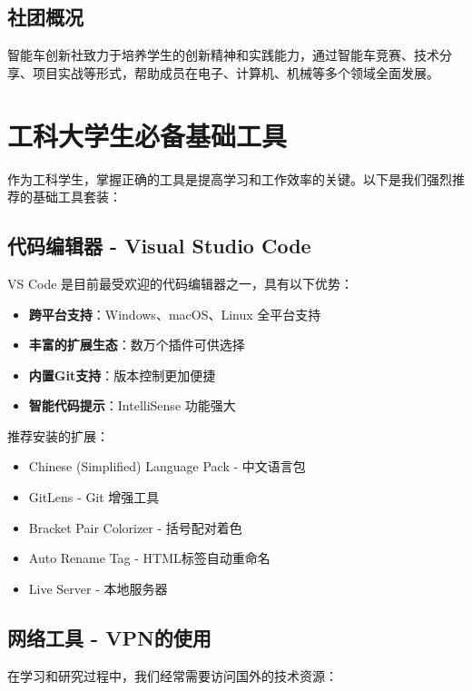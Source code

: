 \documentclass[a4paper,12pt]{article}
\begin{document}
\subsection{社团概况}

智能车创新社致力于培养学生的创新精神和实践能力，通过智能车竞赛、技术分享、项目实战等形式，帮助成员在电子、计算机、机械等多个领域全面发展。

\section{工科大学生必备基础工具}

作为工科学生，掌握正确的工具是提高学习和工作效率的关键。以下是我们强烈推荐的基础工具套装：

\subsection{代码编辑器 - Visual Studio Code}

VS Code 是目前最受欢迎的代码编辑器之一，具有以下优势：

\begin{itemize}
    \item \textbf{跨平台支持}：Windows、macOS、Linux 全平台支持
    \item \textbf{丰富的扩展生态}：数万个插件可供选择
    \item \textbf{内置Git支持}：版本控制更加便捷
    \item \textbf{智能代码提示}：IntelliSense 功能强大
\end{itemize}

\begin{codebox}
推荐安装的扩展：
\begin{itemize}
    \item Chinese (Simplified) Language Pack - 中文语言包
    \item GitLens - Git 增强工具
    \item Bracket Pair Colorizer - 括号配对着色
    \item Auto Rename Tag - HTML标签自动重命名
    \item Live Server - 本地服务器
\end{itemize}
\end{codebox}

\subsection{网络工具 - VPN的使用}

在学习和研究过程中，我们经常需要访问国外的技术资源：
\end{document}
